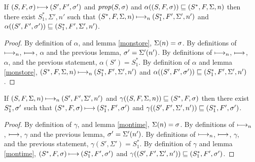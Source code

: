 \documentclass{llncs}
\newcommand{\prop}{\mathit{prop}}
\begin{document}
\begin{theorem}
If $(S,F,\sigma) \mathbin{\longmapsto} (S',F',\sigma')$ and $\prop(S,\msto)$ and $\alpha((S,F,\sigma))
\sqsubseteq (S^*,F,\Sigma,n)$ then there exist $S^*_1,\Sigma',n'$ such
that $(S^*,F,\Sigma,n) \mathbin{\longmapsto_n} (S^*_1,F',\Sigma',n')$ and
$\alpha((S',F',\sigma')) \sqsubseteq (S^*_1,F',\Sigma',n')$.
\end{theorem}
\begin{proof}
By definition of $\alpha$, and lemma \ref{monstore}, $\Sigma(n) = \sigma$.
By definitions of $\mathbin{\longmapsto_n}$, $\mathbin{\longmapsto}$, $\alpha$ and the previous lemma, $\sigma' = \Sigma'(n')$.
By definitions of $\mathbin{\longmapsto_n}$, $\mathbin{\longmapsto}$, $\alpha$, and the previous statement, $\alpha(S') = S^*_1$.
By definition of $\alpha$ and lemma \ref{monstore}, $(S^*,F,\Sigma,n) \mathbin{\longmapsto_n} (S^*_1,F',\Sigma',n')$ and $\alpha((S',F',\sigma')) \sqsubseteq (S^*_1,F',\Sigma',n')$.
\end{proof}

\begin{theorem}
If $(S,F,\Sigma,n) \mathbin{\longmapsto_n} (S',F',\Sigma',n')$ and
$\gamma((S,F,\Sigma,n)) \sqsubseteq (S^*,F,\sigma)$ then there exist
$S^*_1,\sigma'$ such that $(S^*,F,\sigma) \mathbin{\longmapsto} (S^*_1,F',\sigma')$
and $\gamma((S',F',\Sigma',n')) \sqsubseteq (S^*_1,F',\sigma')$.
\end{theorem}
\begin{proof}
By definition of $\gamma$, and lemma \ref{montime}, $\Sigma(n) = \sigma$.
By definitions of $\mathbin{\longmapsto_n}$, $\mathbin{\longmapsto}$, $\gamma$ and the previous lemma, $\sigma' = \Sigma'(n')$.
By definitions of $\mathbin{\longmapsto_n}$, $\mathbin{\longmapsto}$, $\gamma$, and the previous statement, $\gamma(S',\Sigma') = S^*_1$.
By definition of $\gamma$ and lemma \ref{montime}, $(S^*,F,\sigma) \mathbin{\longmapsto} (S^*_1,F',\sigma')$ and $\gamma((S',F',\Sigma',n')) \sqsubseteq (S^*_1,F',\sigma')$.
\end{proof}
\end{document}
